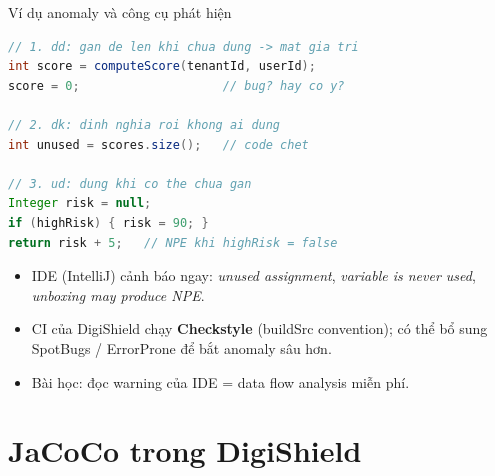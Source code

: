\documentclass[aspectratio=169,12pt]{beamer}
\begin{document}
\begin{frame}[fragile]{Ví dụ anomaly và công cụ phát hiện}
\begin{lstlisting}[language=java,basicstyle=\ttfamily\scriptsize]
// 1. dd: gan de len khi chua dung -> mat gia tri
int score = computeScore(tenantId, userId);
score = 0;                    // bug? hay co y?

// 2. dk: dinh nghia roi khong ai dung
int unused = scores.size();   // code chet

// 3. ud: dung khi co the chua gan
Integer risk = null;
if (highRisk) { risk = 90; }
return risk + 5;   // NPE khi highRisk = false
\end{lstlisting}

  \begin{itemize}
    \item IDE (IntelliJ) cảnh báo ngay: \textit{unused assignment},
          \textit{variable is never used}, \textit{unboxing may produce NPE}.
    \item CI của DigiShield chạy \textbf{Checkstyle} (buildSrc convention);
          có thể bổ sung SpotBugs / ErrorProne để bắt anomaly sâu hơn.
    \item Bài học: đọc warning của IDE = data flow analysis miễn phí.
  \end{itemize}
\end{frame}

\section{JaCoCo trong DigiShield}
\end{document}
